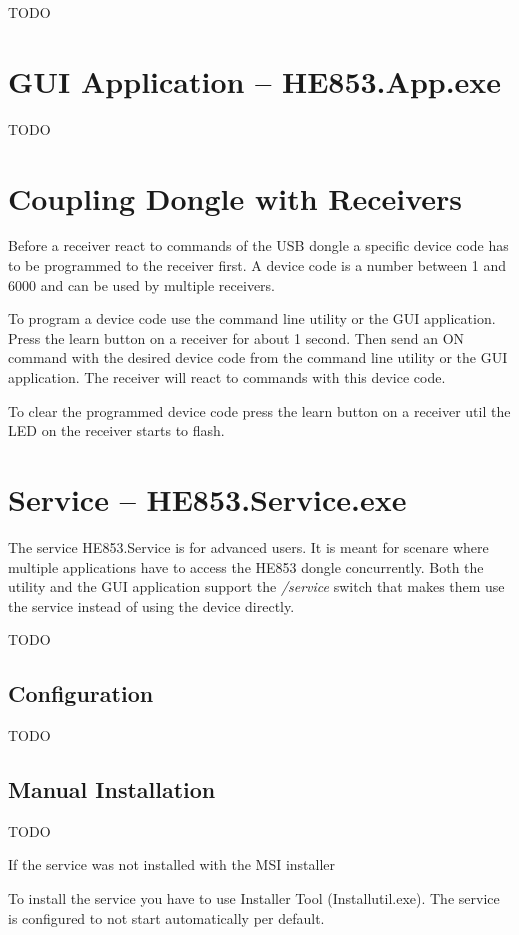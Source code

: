 \documentclass[
a4paper,
oneside,
halfparskip*,
normalheadings,
]
{scrbook}
\begin{document}
TODO

\section{GUI Application -- HE853.App.exe}

TODO

\section{Coupling Dongle with Receivers}

Before a receiver react to commands of the USB dongle a specific device code has to be
programmed to the receiver first. A device code is a number between 1 and 6000 and can
be used by multiple receivers.

To program a device code use the command line utility or the GUI application. Press the
learn button on a receiver for about 1 second. Then send an ON command with the desired
device code from the command line utility or the GUI application. The receiver will
react to commands with this device code.

To clear the programmed device code press the learn button on a receiver util the LED
on the receiver starts to flash.

\section{Service -- HE853.Service.exe}

The service HE853.Service is for advanced users. It is meant for scenare where multiple
applications have to access the HE853 dongle concurrently. Both the utility and the
GUI application support the \textit{/service} switch that makes them use the service
instead of using the device directly.

TODO

\subsection{Configuration}

TODO

\subsection{Manual Installation}

TODO

If the service was not installed with the MSI installer

To install the service you have to use Installer Tool (Installutil.exe). The service is
configured to not start automatically per default. 
\end{document}

